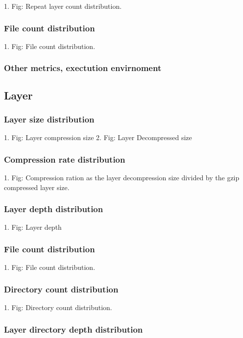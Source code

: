 1. Fig: Repeat layer count distribution.

\subsubsection{File count distribution}

1. Fig: File count distribution.

\subsubsection{Other metrics, exectution envirnoment}

\subsection{Layer}

\subsubsection{Layer size distribution}

1. Fig: Layer compression size 
2. Fig: Layer Decompressed size

\subsubsection{Compression rate distribution}

1. Fig: Compression ration as the layer decompression size divided by the gzip compressed layer size.

\subsubsection{Layer depth distribution}

1. Fig: Layer depth

\subsubsection{File count distribution}

1. Fig: File count distribution.

\subsubsection{Directory count distribution}

1. Fig: Directory count distribution.

\subsubsection{Layer directory depth distribution}

